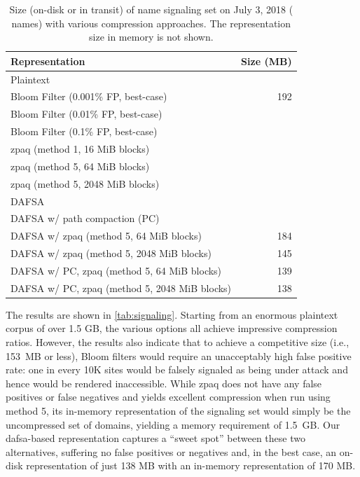 \begin{table}[tbp]
  \centering
  \caption{Size (on-disk or in transit) of \ac{name} signaling set on
    July 3, 2018 (\numnames{} names) with various compression approaches. The
    representation size in memory is not shown.}
  \begin{tabular}{|lr|}
    \toprule
    \textbf{Representation} & \textbf{Size (MB)} \\
    \midrule
    Plaintext & \plaintextsize \\
    \midrule
    Bloom Filter (0.001\% FP, best-case) & 192 \\
    Bloom Filter (0.01\% FP, best-case) & \bloomlargesize \\
    Bloom Filter (0.1\% FP, best-case) & \bloommedsize \\
    \midrule
    zpaq (method 1, 16 MiB blocks) & \zpaqlargesize \\
    zpaq (method 5, 64 MiB blocks) & \zpaqmedsize \\
    zpaq (method 5, 2048 MiB blocks) & \zpaqsmallsize \\
    \midrule
    DAFSA & \fsalargesize \\
    DAFSA w/ path compaction (PC) & \fsamedsize \\
    DAFSA w/ zpaq (method 5, 64 MiB blocks) & 184 \\
    DAFSA w/ zpaq (method 5, 2048 MiB blocks) & 145 \\
    DAFSA w/ PC, zpaq (method 5, 64 MiB blocks) & 139 \\
    DAFSA w/ PC, zpaq (method 5, 2048 MiB blocks) & 138 \\
    \bottomrule
  \end{tabular}
  \label{tab:signaling}
\end{table}

The results are shown in \autoref{tab:signaling}. 
Starting from an enormous plaintext corpus of over 1.5 GB,
the various options all achieve impressive compression ratios.
However, the results also indicate that to achieve a competitive size (i.e., 153~MB or less),
Bloom filters would require an unacceptably high false 
positive rate: one in every 10K sites would be falsely signaled
as being under attack and hence would be rendered inaccessible.
While zpaq does not have any false positives or false
negatives and yields excellent compression when run using method 5, 
its in-memory representation of the
signaling set would simply be the uncompressed set of domains, yielding a memory
requirement of 1.5~GB. Our \ac{dafsa}-based representation captures a ``sweet
spot'' between these two alternatives, suffering no false positives or negatives and, in the
best case, an on-disk representation of just 138 MB with an in-memory
representation of 170 MB.

